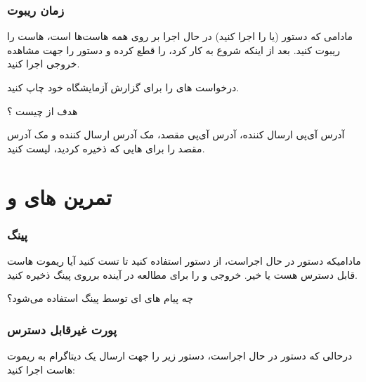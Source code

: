 \documentclass{../UTNetLabFa}
\begin{document}
	\section{زمان ریبوت }
	
	مادامی که دستور  (یا  را اجرا کنید) در حال اجرا بر روی همه هاست‌ها است، هاست  را ریبوت کنید. بعد از اینکه  شروع به کار کرد،  را قطع کرده و دستور \mbox{} را جهت مشاهده خروجی  اجرا کنید.
	
	درخواست های \mbox{} را برای گزارش آزمایشگاه خود چاپ کنید.
	\begin{report}
		\item
		هدف از \mbox{} چیست ؟
		\item 
			آدرس آی‌پی ارسال کننده، آدرس آی‌پی مقصد، مک آدرس ارسال کننده و مک آدرس مقصد را برای \mbox{} هایی که ذخیره کردید، لیست کنید.
	\end{report}

	
	\part{تمرین های  و \textLR{ping}}
	
	\section {پینگ \textLR{ICMP}}
	مادامیکه دستور  در حال اجراست، از دستور \mbox{} استفاده کنید تا تست کنید آیا ریموت هاست قابل دسترس هست یا خیر. خروجی  و  را برای مطالعه در آینده برروی پینگ ذخیره کنید.
	
	
	\begin{report}
		\item
		چه پیام های  ای توسط پینگ استفاده می‌شود؟
	\end{report}


\section {پورت غیرقابل دسترس }
درحالی که دستور  در حال اجراست، دستور  زیر را جهت ارسال یک دیتاگرام  به ریموت هاست اجرا کنید:
\end{document}

